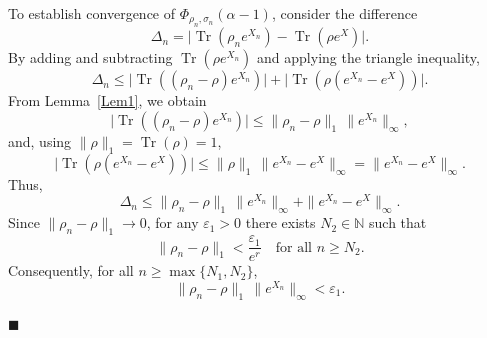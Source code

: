 \documentclass[a4paper, amsfonts, amssymb, amsmath, reprint, showkeys, nofootinbib, twoside, aps, pra]{revtex4-2}
\theoremstyle{definition}
\renewenvironment{proof}{\noindent{\bfseries Proof.}}{\hfill$\blacksquare$}
\begin{document}
\begin{proof}
To establish convergence of $\Phi_{\rho_n,\sigma_n}(\alpha-1)$,
consider the difference
\begin{equation}
    \Delta_n =
    \big|
    \operatorname{Tr}(\rho_n e^{X_n})
    -
    \operatorname{Tr}(\rho e^{X})
    \big|.
\end{equation}
By adding and subtracting $\operatorname{Tr}(\rho e^{X_n})$ and applying the
triangle inequality,
\begin{equation}
    \Delta_n \le \big|\operatorname{Tr}((\rho_n-\rho)e^{X_n})\big|+
    \big|\operatorname{Tr}(\rho(e^{X_n}-e^{X}))\big|.
\end{equation}
From Lemma~\ref{Lem1}, we obtain 
\begin{equation}
    \big|\operatorname{Tr}((\rho_n-\rho)e^{X_n})\big|\le\|\rho_n-\rho\|_1 \, \|e^{X_n}\|_\infty,
\end{equation}
and, using $\|\rho\|_1 = \operatorname{Tr}(\rho) = 1$,
\begin{equation}
    \big|\operatorname{Tr}(\rho(e^{X_n}-e^{X}))\big|\le
    \|\rho\|_1 \, \|e^{X_n}-e^{X}\|_{\infty} = \|e^{X_n}-e^{X}\|_{\infty}.
\end{equation}
Thus, 
\begin{equation}
    \Delta_n\le \|\rho_n-\rho\|_1 \, \|e^{X_n}\|_{\infty}
    + \|e^{X_n}-e^{X}\|_{\infty}.
\end{equation}
Since $\|\rho_n-\rho\|_1 \to 0$, for any $\varepsilon_1>0$ there exists $N_2\in\mathbb{N}$ 
such that
\begin{equation}
    \|\rho_n-\rho\|_1 < \frac{\varepsilon_1}{e^{r}}
    \quad \text{for all } n\ge N_2.
\end{equation}
Consequently, for all $n\ge \max\{N_1,N_2\}$,
\begin{equation}
    \|\rho_n-\rho\|_1\,\|e^{X_n}\|_{\infty} < \varepsilon_1.
\end{equation}    


\end{proof}
\end{document}

